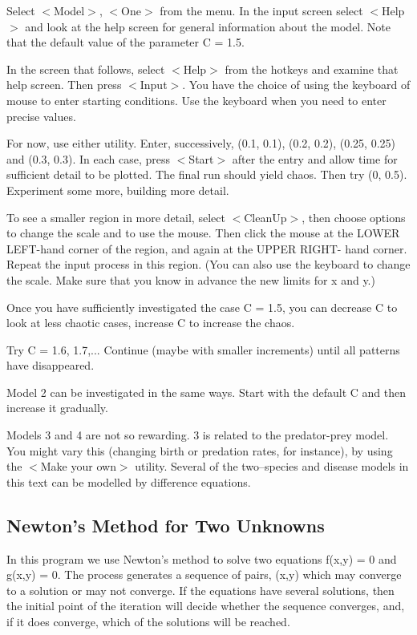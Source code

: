   Select $<$Model$>$, $<$One$>$ from the menu. In the input screen select
$<$Help$>$ and look at the help screen for general information about the
model. Note that the default value of the parameter C = 1.5.

   In the screen that follows, select $<$Help$>$ from the hotkeys and examine
that help screen. Then press $<$Input$>$. You have the choice of using the
keyboard of mouse to enter starting conditions. Use the keyboard when
you need to enter precise values.

   For now, use either utility. Enter, successively, (0.1, 0.1),
(0.2, 0.2), (0.25, 0.25) and (0.3, 0.3). In each case, press $<$Start$>$
after the entry and allow time for sufficient detail to be plotted.
The final run should yield chaos. Then try (0, 0.5). Experiment some
more, building more detail.

   To see a smaller region in more detail, select $<$CleanUp$>$, then choose
options to change the scale and to use the mouse. Then click the mouse
at the LOWER LEFT-hand corner of the region, and again at the UPPER RIGHT-
hand corner. Repeat the input process in this region. (You can also use
the keyboard to change the scale. Make sure that you know in advance the
new limits for x and y.)

   Once you have sufficiently investigated the case C = 1.5, you can
decrease C to look at less chaotic cases, increase C to increase the chaos.

   Try C = 1.6, 1.7,...  Continue (maybe with smaller increments) until
all patterns have disappeared.

   Model 2 can be investigated in the same ways. Start with the default
C and then increase it gradually.

   Models 3 and 4 are not so rewarding. 3 is related to the predator-prey
model. You might vary this (changing birth or predation rates, for
instance), by using the $<$Make your own$>$ utility. Several of the two--species
and disease models in this text can be modelled by difference equations.


\subsection{Newton's Method for Two Unknowns}

   In this program we use Newton's method to solve two equations
            f(x,y) = 0   and   g(x,y) = 0.
The process generates a sequence of pairs, (x,y) which may converge
to a solution or may not converge. If the equations have several
solutions, then the initial point of the iteration will decide whether
the sequence converges, and, if it does converge, which of the
solutions will be reached.

